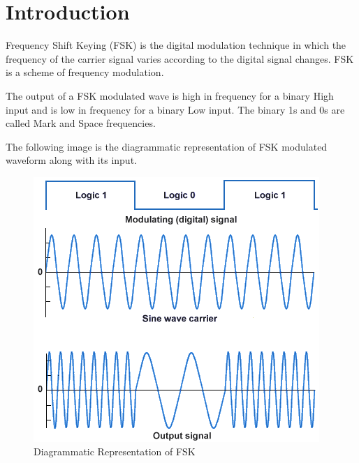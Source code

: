 \documentclass{report}
\begin{document}
	\section{Introduction}{
		\bigskip
		
	Frequency Shift Keying (FSK) is the digital modulation technique in which the frequency of the carrier signal varies according to the digital signal changes. FSK is a scheme of frequency modulation.\bigskip
	
	The output of a FSK modulated wave is high in frequency for a binary High input and is low in frequency for a binary Low input. The binary 1s and 0s are called Mark and Space frequencies.\bigskip
	
	The following image is the diagrammatic representation of FSK modulated waveform along with its input.
		\bigskip
		
\begin{figure}[H]
	\centering
	\includegraphics[scale=0.8]{images/2.png}
	\caption{Diagrammatic Representation of FSK}
	\label{fig:}
\end{figure}
	}
	
\end{document}
